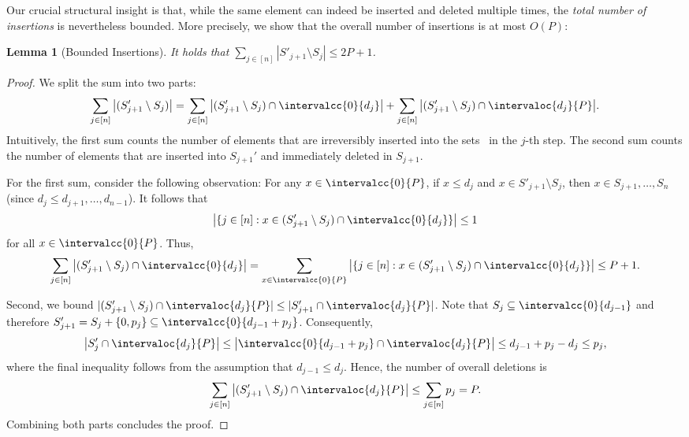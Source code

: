 \documentclass[10pt,a4paper]{article}
\newtheorem{lemma}{Lemma}[section]
\DeclarePairedDelimiter\set{\lbrace}{\rbrace}
\newcommand\Order{O}
\begin{document}
Our crucial structural insight is that, while the same element can indeed be inserted and deleted multiple times, the \emph{total number of insertions} is nevertheless bounded. More precisely, we show that the overall number of insertions is at most $\Order(P)$:

\begin{lemma}[Bounded Insertions]
    \label{lem:s-sets}
    It holds that $\sum_{j\in[n]} |S'_{j+1} \setminus S_{j}| \le 2P + 1$.
\end{lemma}
\begin{proof}
    We split the sum into two parts:
    \[
        \sum_{j\in[n]} \big|(S'_{j+1} \setminus S_{j})\big| = \sum_{j\in[n]} \big|(S'_{j+1} \setminus S_{j}) \cap \intervalcc{0}{d_j}\big| + \sum_{j\in[n]} \big|(S'_{j+1} \setminus S_{j}) \cap \intervaloc{d_j}{P}\big|.
    \]
    Intuitively, the first sum counts the number of elements that are irreversibly inserted into the sets~ in the $j$-th step.
    The second sum counts the number of elements that are inserted into $S_{j+1}'$ and immediately deleted in $S_{j+1}$.

    For the first sum, consider the following observation: For any $x \in \intervalcc{0}{P}$, if $x \le d_j$ and $x \in S'_{j+1} \setminus S_{j}$, then $x \in S_{j+1}, \dots , S_n$ (since $d_j \le d_{j+1}, \dots, d_{n-1}$).
    It follows that
    \[
        \big|\set{ j \in [n] : x \in (S'_{j+1} \setminus S_{j}) \cap \intervalcc{0}{d_j}}\big| \le 1
    \]
    for all $x \in \intervalcc{0}{P}$.
    Thus,
    \begin{align*}
        \sum_{j\in[n]} \big|(S'_{j+1} \setminus S_{j}) \cap \intervalcc{0}{d_j}\big| 
        =  \sum_{x\in\intervalcc{0}{P}} \big|\set{ j \in [n] : x \in (S'_{j+1} \setminus S_{j}) \cap \intervalcc{0}{d_j}}\big| 
        \le P + 1.
    \end{align*}   

    Second, we bound $|(S'_{j+1} \setminus S_{j}) \cap \intervaloc{d_j}{P}| \le |S'_{j+1} \cap \intervaloc{d_j}{P}|$.
    Note that $S_{j} \subseteq \intervalcc{0}{d_{j-1}}$ and therefore $S_{j+1}' = S_{j} + \set{0, p_j} \subseteq \intervalcc{0}{d_{j-1} + p_j}$.
    Consequently,
    \begin{align*}
        \big|S'_j \cap \intervaloc{d_j}{P} \big|
        \le \big| \intervalcc{0}{d_{j-1} + p_j} \cap  \intervaloc{d_j}{P} \big| 
        \le d_{j-1} + p_j - d_j 
        \le p_j,
    \end{align*}
    where the final inequality follows from the assumption that $d_{j-1} \le d_j$.
    Hence, the number of overall deletions is
    \[
        \sum_{j\in[n]} \big|(S'_{j+1} \setminus S_{j}) \cap \intervaloc{d_j}{P}\big| \le \sum_{j\in[n]} p_j = P.
    \]
    Combining both parts concludes the proof.
\end{proof}
\end{document}
